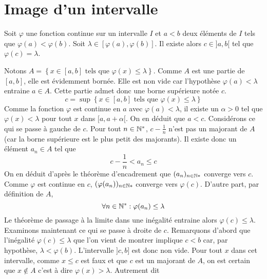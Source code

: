 \section{Image d'un intervalle}
\begin{propn} \label{proptvi}
Soit $\varphi$ une fonction continue sur un intervalle $I$ et $a<b$ deux éléments de $I$ tels que $\varphi(a)<\varphi(b)$. Soit $\lambda \in [\varphi(a),\varphi(b)]$. Il existe alors $c\in]a,b[$ tel que $\varphi(c)=\lambda$.
\end{propn}
\begin{demo}
 
 Notons $A=\left\lbrace x\in[a,b] \text{ tels que } \varphi(x)\leq \lambda \right\rbrace$.\newline
Comme $A$ est une partie de $[a,b]$, elle est évidemment bornée. Elle est non vide car l'hypothèse $\varphi(a)<\lambda$ entraine $a\in A$. Cette partie admet donc une borne supérieure notée $c$.
\begin{displaymath}
 c = \sup\left\lbrace x\in[a,b] \text{ tels que } \varphi(x)\leq \lambda \right\rbrace
\end{displaymath}
Comme la fonction $\varphi$ est continue en $a$ avec $\varphi(a)<\lambda$, il existe un $\alpha >0$ tel que $\varphi(x)<\lambda$ pour tout $x$ dans $[a,a+\alpha[$. On en déduit que $a<c$.\newline
Considérons ce qui se passe à gauche de $c$. Pour tout $n\in\mathbb{N}^*$, $c-\frac{1}{n}$ n'est pas un majorant de $A$ (car la borne supérieure est le plus petit des majorants). Il existe donc un élément $a_n\in A$ tel que
\begin{displaymath}
 c-\frac{1}{n} < a_n \leq c
\end{displaymath}
On en déduit d'après le théorème d'encadrement que $(a_n)_{n\in \mathbb{N}*}$ converge vers $c$.\newline
Comme $\varphi$ est continue en $c$, $(\varphi(a_n))_{n\in \mathbb{N}*}$ converge vers $\varphi(c)$. D'autre part, par définition de $A$, 
\begin{displaymath}
 \forall n\in \mathbb{N}^* : \varphi(a_n) \leq \lambda
\end{displaymath}
Le théorème de passage à la limite dans une inégalité entraine alors $\varphi(c)\leq \lambda$.\newline
Examinons maintenant ce qui se passe à droite de $c$.\newline
Remarquons d'abord que l'inégalité $\varphi(c)\leq \lambda$ que l'on vient de montrer implique $c<b$ car, par hypothèse, $\lambda < \varphi(b)$. L'intervalle $]c,b]$ est donc non vide. Pour tout $x$ dans cet intervalle, comme $x\leq c$ est faux et que $c$ est un majorant de $A$, on est certain que $x\not \in A$ c'est à dire $\varphi(x)>\lambda$. Autrement dit

\end{demo}
